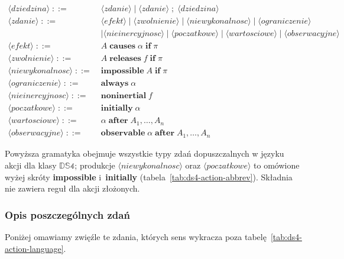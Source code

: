 \documentclass[11pt,a4paper]{article}
\newcommand{\initially}{\textbf{initially}}
\newcommand{\impossible}{\textbf{impossible}}
\theoremstyle{definition}
\begin{document}
\begin{align*}
\langle \textit{dziedzina} \rangle \;::=\;& \langle \textit{zdanie} \rangle
\mid \langle \textit{zdanie} \rangle \; ; \; \langle \textit{dziedzina} \rangle \\[4pt]
\langle \textit{zdanie} \rangle \;::=\;& \langle \textit{efekt} \rangle
\mid \langle \textit{zwolnienie} \rangle
\mid \langle \textit{niewykonalnosc} \rangle
\mid \langle \textit{ograniczenie} \rangle \\
&\mid \langle \textit{nieinercyjnosc} \rangle
\mid \langle \textit{poczatkowe} \rangle
\mid \langle \textit{wartosciowe} \rangle
\mid \langle \textit{obserwacyjne} \rangle \\[4pt]
\langle \textit{efekt} \rangle \;::=\;&
A \;\textbf{causes}\; \alpha \;\textbf{if}\; \pi \\[4pt]
\langle \textit{zwolnienie} \rangle \;::=\;&
A \;\textbf{releases}\; f \;\textbf{if}\; \pi \\[4pt]
\langle \textit{niewykonalnosc} \rangle \;::=\;&
\textbf{impossible}\; A \;\textbf{if}\; \pi \\[4pt]
\langle \textit{ograniczenie} \rangle \;::=\;&
\textbf{always}\; \alpha \\[4pt]
\langle \textit{nieinercyjnosc} \rangle \;::=\;&
\textbf{noninertial}\; f \\[4pt]
\langle \textit{poczatkowe} \rangle \;::=\;&
\textbf{initially}\; \alpha \\[4pt]
\langle \textit{wartosciowe} \rangle \;::=\;&
\alpha \;\textbf{after}\; A_1,\dots,A_n \\[4pt]
\langle \textit{obserwacyjne} \rangle \;::=\;&
\textbf{observable}\; \alpha \;\textbf{after}\; A_1,\dots,A_n
\end{align*}

Powyższa gramatyka obejmuje wszystkie typy zdań dopuszczalnych w języku akcji dla klasy $\mathbb{DS4}$; produkcje $\langle \textit{niewykonalnosc} \rangle$ oraz $\langle \textit{poczatkowe} \rangle$ to omówione wyżej skróty \impossible{} i~\initially{} (tabela~\ref{tab:ds4-action-abbrev}). Składnia nie zawiera reguł dla akcji złożonych.

\subsubsection{Opis poszczególnych zdań}

Poniżej omawiamy zwięźle te zdania, których sens wykracza poza tabelę~\ref{tab:ds4-action-language}.
\end{document}

